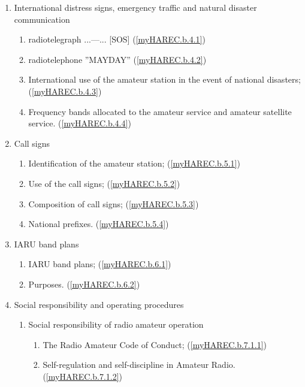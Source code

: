 \begin{enumerate}
\item International distress signs, emergency traffic and natural disaster
  communication
\begin{enumerate}
\item radiotelegraph ...---... [SOS] (\ref{myHAREC.b.4.1})\label{HAREC.b.4.1}
\item radiotelephone ''MAYDAY'' (\ref{myHAREC.b.4.2})\label{HAREC.b.4.2}
\item International use of the amateur station in the event of national
  disasters; (\ref{myHAREC.b.4.3})\label{HAREC.b.4.3}
\item Frequency bands allocated to the amateur service and amateur satellite
  service. (\ref{myHAREC.b.4.4})\label{HAREC.b.4.4}
\end{enumerate}

\item Call signs
\begin{enumerate}
\item Identification of the amateur station;
  (\ref{myHAREC.b.5.1})\label{HAREC.b.5.1}
\item Use of the call signs; (\ref{myHAREC.b.5.2})\label{HAREC.b.5.2}
\item Composition of call signs; (\ref{myHAREC.b.5.3})\label{HAREC.b.5.3}
\item National prefixes. (\ref{myHAREC.b.5.4})\label{HAREC.b.5.4}
\end{enumerate}

\item IARU band plans
\begin{enumerate}
\item IARU band plans; (\ref{myHAREC.b.6.1})\label{HAREC.b.6.1}
\item Purposes. (\ref{myHAREC.b.6.2})\label{HAREC.b.6.2}
\end{enumerate}

\item Social responsibility and operating procedures
\begin{enumerate}
\item Social responsibility of radio amateur operation
\begin{enumerate}
\item The Radio Amateur Code of Conduct;
  (\ref{myHAREC.b.7.1.1})\label{HAREC.b.7.1.1}
\item Self-regulation and self-discipline in Amateur Radio.
  (\ref{myHAREC.b.7.1.2})\label{HAREC.b.7.1.2}
\end{enumerate}


\end{enumerate}
\end{enumerate}
